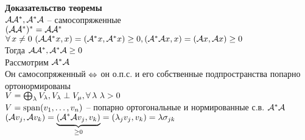 \documentclass[12pt]{article}
\begin{document}
\textbf{Доказательство теоремы}\\
$\mcA\mcA^*, \mcA^*\mcA$ -- самосопряженные\\
$(\mcA\mcA^*)^* = \mcA\mcA^*$\\
$\fall x \neq 0\ (\mcA\mcA^*x, x) = (\mcA^* x, \mcA^* x) \geq 0, (\mcA^*\mcA x, x) =(\mcA x, \mcA x) \geq 0$\\
Тогда $\mcA\mcA^*, \mcA^*\mcA \geq 0$\\
Рассмотрим $\mcA^*\mcA$\\
Он самосопряженный $\LRto$ он о.п.с. и его собственные подпространства попарно ортонормированы\\
$V = \bigoplus_\lambda V_\lambda, V_\lambda \perp V_\mu, \fall \lambda\ \lambda > 0$\\
$V = \span(v_1, \ldots, v_n)$ -- попарно ортогональные и нормированные с.в. $\mcA^*\mcA$\\
$(\mcA v_j, \mcA v_k) = \ub{\geq 0}{(\mcA^* \mcA v_j, v_k)} = (\lambda_j v_j, v_k) = \lambda\sigma_{jk}$\\
\end{document}

